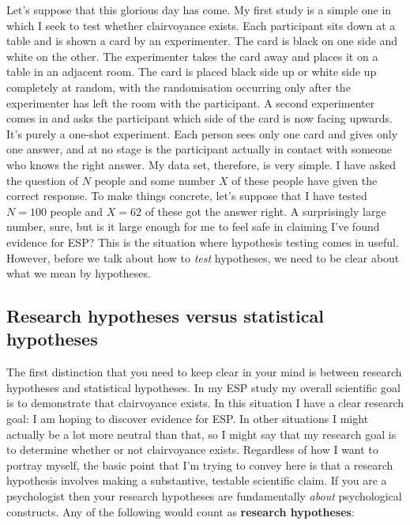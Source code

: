 \documentclass[
]{book}
\begin{document}
Let's suppose that this glorious day has come. My first study is a simple one in which I seek to test whether clairvoyance exists. Each participant sits down at a table and is shown a card by an experimenter. The card is black on one side and white on the other. The experimenter takes the card away and places it on a table in an adjacent room. The card is placed black side up or white side up completely at random, with the randomisation occurring only after the experimenter has left the room with the participant. A second experimenter comes in and asks the participant which side of the card is now facing upwards. It's purely a one-shot experiment. Each person sees only one card and gives only one answer, and at no stage is the participant actually in contact with someone who knows the right answer. My data set, therefore, is very simple. I have asked the question of \(N\) people and some number \(X\) of these people have given the correct response. To make things concrete, let's suppose that I have tested \(N = 100\) people and \(X = 62\) of these got the answer right. A surprisingly large number, sure, but is it large enough for me to feel safe in claiming I've found evidence for ESP? This is the situation where hypothesis testing comes in useful. However, before we talk about how to \emph{test} hypotheses, we need to be clear about what we mean by hypotheses.

\hypertarget{research-hypotheses-versus-statistical-hypotheses}{%
\subsection{Research hypotheses versus statistical hypotheses}\label{research-hypotheses-versus-statistical-hypotheses}}

The first distinction that you need to keep clear in your mind is between research hypotheses and statistical hypotheses. In my ESP study my overall scientific goal is to demonstrate that clairvoyance exists. In this situation I have a clear research goal: I am hoping to discover evidence for ESP. In other situations I might actually be a lot more neutral than that, so I might say that my research goal is to determine whether or not clairvoyance exists. Regardless of how I want to portray myself, the basic point that I'm trying to convey here is that a research hypothesis involves making a substantive, testable scientific claim. If you are a psychologist then your research hypotheses are fundamentally \emph{about} psychological constructs. Any of the following would count as {\textbf{research hypotheses}}:
\end{document}
